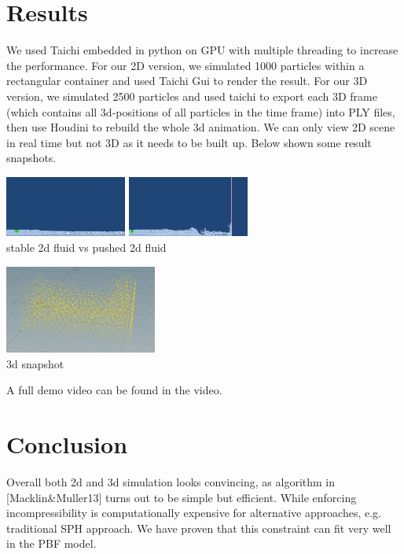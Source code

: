 \documentclass[sigconf]{acmart}
\begin{document}
\section{Results}
We used Taichi embedded in python on GPU with multiple threading to increase the performance. For our 2D version, we simulated 1000 particles within a rectangular container and used Taichi Gui to render the result. For our 3D version, we simulated 2500 particles and used taichi to export each 3D frame (which contains all 3d-positions of all particles in the time frame) into PLY files, then use Houdini to rebuild the whole 3d animation. We can only view 2D scene in real time but not 3D as it needs to be built up. Below shown some result snapshots.\\ 
\begin{center}
    \includegraphics[width=4cm]{1.png} \includegraphics[width=4cm]{2.png} \\
    stable 2d fluid vs pushed 2d fluid
\end{center}
\begin{center}
    \includegraphics[width=5cm]{3.png}\\
    3d snapshot
\end{center}
A full demo video can be found in the video.

\section{Conclusion}
Overall both 2d and 3d simulation looks convincing, as algorithm in [Macklin\&Muller13] turns out to be simple but efficient. While enforcing incompressibility is computationally expensive for alternative approaches, e.g. traditional SPH approach. We have proven that this constraint can fit very well in the PBF model.
\end{document}
